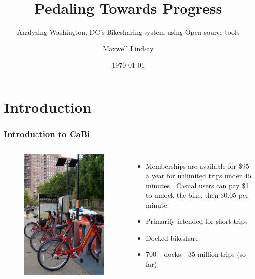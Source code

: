 \documentclass{beamer}
\title{Pedaling Towards Progress}
\subtitle{Analyzing Washington, DC's Bikesharing system using Open-source tools}
\author{Maxwell Lindsay}
\institute{Van Oord}
\date{\today}
\begin{document}
\begin{frame}
    \titlepage
\end{frame}
\section{Introduction}
\begin{frame}
    \frametitle{Introduction to CaBi}
    \begin{columns}
        \begin{figure}
            \includegraphics[]{800px-VA_07_2012_Capital_Bikeshare_4152.JPG}
        \end{figure}
        \begin{itemize}
            \item Memberships are available for \$95 a year for unlimited trips under 45 minutes \cite{cabisite}. Casual users can pay \$1 to unlock the bike, then \$0.05 per minute.
            \item Primarily intended for short trips
            \item Docked bikeshare
            \item 700+ docks, ~35 million trips (so far)
        \end{itemize}


\end{columns}
\end{frame}
\end{document}

